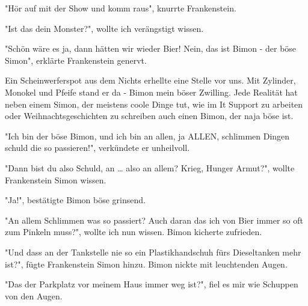 \documentclass[ebook]{article}
\begin{document}
\begin{center}
"Hör auf mit der Show und komm raus", knurrte Frankenstein.
\end{center}

\begin{center}
"Ist das dein Monster?", wollte ich verängstigt wissen.
\end{center}

\begin{center}
"Schön wäre es ja, dann hätten wir wieder Bier! Nein, das ist
Bimon - der böse Simon", erklärte Frankenstein genervt.
\end{center}

\noindent Ein Scheinwerferspot aus dem Nichts erhellte eine Stelle
vor uns. Mit Zylinder, Monokel und Pfeife stand er da - Bimon mein
böser Zwilling. Jede Realität hat neben einem Simon, der meistens
coole Dinge tut, wie im It Support zu arbeiten oder
Weihnachtsgeschichten zu schreiben auch einen Bimon, der naja böse
ist.

\begin{center}
"Ich bin der böse Bimon, und ich bin an allen, ja ALLEN, schlimmen
Dingen schuld die so passieren!", verkündete er unheilvoll.
\end{center}

\begin{center}
"Dann bist du also Schuld, an \ldots{} also an allem? Krieg, Hunger
Armut?", wollte Frankenstein Simon wissen. 
\end{center}

\begin{center}
"Ja!", bestätigte Bimon böse grinsend.
\end{center}

\begin{center}
"An allem Schlimmen was so passiert? Auch daran das ich von Bier
immer so oft zum Pinkeln muss?", wollte ich nun wissen. Bimon
kicherte zufrieden.
\end{center}

\begin{center}
"Und dass an der Tankstelle nie so ein Plastikhandschuh fürs
Dieseltanken mehr ist?", fügte Frankenstein Simon hinzu. Bimon
nickte mit leuchtenden Augen.
\end{center}

\begin{center}
"Das der Parkplatz vor meinem Haus immer weg ist?", fiel es mir wie
Schuppen von den Augen.
\end{center}
\end{document}
